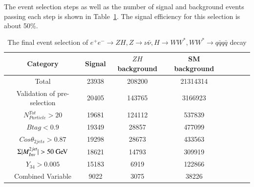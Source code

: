 \documentclass[11pt,a4paper]{cepcnote}
\begin{document}
The event selection steps as well as the number of signal and background
events passing each step is shown in Table~\ref{tab:nnHfourqcutchain}.
The signal efficiency for this selection is about 50\%.
\begin{table}[H]
  \begin{center}
    \begin{tabular}{cccccccc}
      \hline \hline
      \multicolumn{1}{c}{Category}      & \multicolumn{1}{c}{Signal}&\multicolumn{1}{c}{$ZH$ background}&\multicolumn{1}{c}{SM background}\\ 
      \hline
      Total 	      	 					&   23938& 208200&	21314314	\\
	  Validation of pre-selection		  	&   20405& 143765&	3166923	\\
	  $N_{Particle}^{Tot} > 20$				&	19681& 124112& 	537839	\\
	  $Btag < 0.9$							&	19349& 28857 & 	477099	\\
	  $Cos\theta_{2jets} > 0.87  $			&	19298& 28673 &	433563	\\
	  $\Sigma|M_{Inv}^{2jet}| > 50\gev$		&   18621& 14793 &	309919	\\
	  $Y_{34} > 0.005$						&	15183& 6919  &  122866	\\
	  Combined Variable						&	9022 & 3075  &	38226	\\
      \hline \hline
    \end{tabular}
  \caption[Monte Carlo purities in the single lepton sample]{%
  The final event selection of $e^+e^-\rightarrow ZH, Z\rightarrow \nu\bar{\nu}, H\rightarrow WW^*, WW^*\rightarrow q\bar{q}q\bar{q}$ decay}
  \label{tab:nnHfourqcutchain}
  \end{center}
\end{table}
\end{document}
